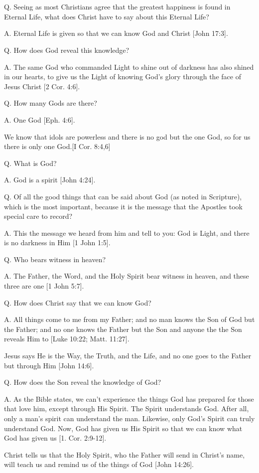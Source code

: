 \documentclass[../main.tex]{subfiles}
\begin{document}
	

	\section*{}
	Q. Seeing as most Christians agree that the greatest happiness is found in Eternal Life, what does Christ have to say about this Eternal Life?
	
	A. Eternal Life is given so that we can know God and Christ [John 17:3].
	
	Q. How does God reveal this knowledge?
	
	A. The same God who commanded Light to shine out of darkness has also shined in our hearts, to give us the Light of knowing God's glory through the face of Jesus Christ [2 Cor. 4:6]. 
	
	Q. How many Gods are there?
	
	A. One God [Eph. 4:6]. 
	
	We know that idols are powerless and there is no god but the one God, so for us there is only one God.[I Cor. 8:4,6] 
	
	Q. What is God?
	
	A. God is a spirit [John 4:24]. 
	
	Q. Of all the good things that can be said about God (as noted in Scripture), which is the most important, because it is the message that the Apostles took special care to record?
	
	A. This the message we heard from him and tell to you: God is Light, and there is no darkness in Him [1 John 1:5].
	
	Q. Who bears witness in heaven?
	
	A. The Father, the Word, and the Holy Spirit bear witness in heaven, and these three are one [1 John 5:7].
	
	Q. How does Christ say that we can know God?
	
	A. All things come to me from my Father; and no man knows the Son of God but the Father; and no one knows the Father but the Son and anyone the the Son reveals Him to [Luke 10:22; Matt. 11:27].
	
	Jesus says He is the Way, the Truth, and the Life, and no one goes to the Father but through Him [John 14:6].
	
	Q. How does the Son reveal the knowledge of God?
	
	A. As the Bible states, we can't experience the things God has prepared for those that love him, except through His Spirit. The Spirit understands God. After all, only a man's spirit can understand the man. Likewise, only God's Spirit can truly understand God. Now, God has given us His Spirit so that we can know what God has given us [1. Cor. 2:9-12].
	
	Christ tells us that the Holy Spirit, who the Father will send in Christ's name, will teach us and remind us of the things of God [John 14:26].
\end{document}
